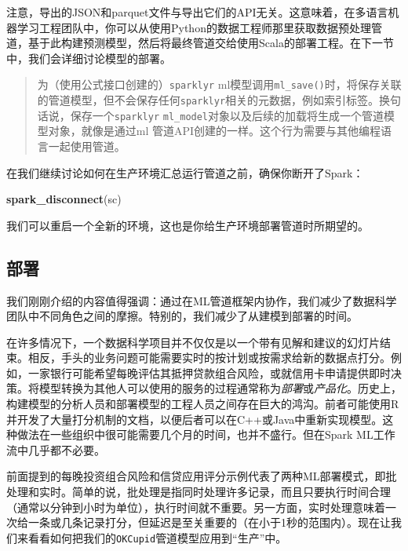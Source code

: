 \documentclass[
]{article}
\newenvironment{Shaded}{\begin{snugshade}}{\end{snugshade}}
\newcommand{\KeywordTok}[1]{\textcolor[rgb]{0.13,0.29,0.53}{\textbf{#1}}}
\newcommand{\NormalTok}[1]{#1}
\begin{document}
注意，导出的JSON和parquet文件与导出它们的API无关。这意味着，在多语言机器学习工程团队中，你可以从使用Python的数据工程师那里获取数据预处理管道，基于此构建预测模型，然后将最终管道交给使用Scala的部署工程。在下一节中，我们会详细讨论模型的部署。

\begin{quote}
为（使用公式接口创建的）\texttt{sparklyr}
ml模型调用\texttt{ml\_save()}时，将保存关联的管道模型，但不会保存任何\texttt{sparklyr}相关的元数据，例如索引标签。换句话说，保存一个\texttt{sparklyr}
\texttt{ml\_model}对象以及后续的加载将生成一个管道模型对象，就像是通过ml
管道API创建的一样。这个行为需要与其他编程语言一起使用管道。
\end{quote}

在我们继续讨论如何在生产环境汇总运行管道之前，确保你断开了Spark：

\begin{Shaded}
\begin{Highlighting}[]
\KeywordTok{spark_disconnect}\NormalTok{(sc)}
\end{Highlighting}
\end{Shaded}

我们可以重启一个全新的环境，这也是你给生产环境部署管道时所期望的。

\hypertarget{ux90e8ux7f72}{%
\subsection{部署}\label{ux90e8ux7f72}}

我们刚刚介绍的内容值得强调：通过在ML管道框架内协作，我们减少了数据科学团队中不同角色之间的摩擦。特别的，我们减少了从建模到部署的时间。

在许多情况下，一个数据科学项目并不仅仅是以一个带有见解和建议的幻灯片结束。相反，手头的业务问题可能需要实时的按计划或按需求给新的数据点打分。例如，一家银行可能希望每晚评估其抵押贷款组合风险，或就信用卡申请提供即时决策。将模型转换为其他人可以使用的服务的过程通常称为\emph{部署}或\emph{产品化}。历史上，构建模型的分析人员和部署模型的工程人员之间存在巨大的鸿沟。前者可能使用R并开发了大量打分机制的文档，以便后者可以在C++或Java中重新实现模型。这种做法在一些组织中很可能需要几个月的时间，也并不盛行。但在Spark
ML工作流中几乎都不必要。

前面提到的每晚投资组合风险和信贷应用评分示例代表了两种ML部署模式，即批处理和实时。简单的说，批处理是指同时处理许多记录，而且只要执行时间合理（通常以分钟到小时为单位），执行时间就不重要。另一方面，实时处理意味着一次给一条或几条记录打分，但延迟是至关重要的（在小于1秒的范围内）。现在让我们来看看如何把我们的\texttt{OKCupid}管道模型应用到``生产''中。
\end{document}
